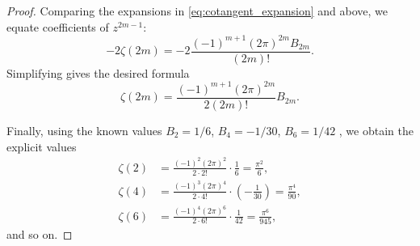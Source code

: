 \begin{corollary}
\begin{proof}
Comparing the expansions in \eqref{eq:cotangent_expansion} and above, we equate coefficients of $z^{2m-1}$:
$$
-2 \zeta(2m) = -2 \frac{(-1)^{m+1} (2\pi)^{2m} B_{2m}}{(2m)!}.
$$
Simplifying gives the desired formula
$$
\zeta(2m) = \frac{(-1)^{m+1} (2\pi)^{2m}}{2 (2m)!} B_{2m}.
$$

Finally, using the known values $B_2 = 1/6$, $B_4 = -1/30$, $B_6 = 1/42$ , we obtain the explicit values
\begin{align*}
\zeta(2) &= \frac{(-1)^{2} (2\pi)^2}{2 \cdot 2!} \cdot \frac{1}{6} = \frac{\pi^2}{6}, \\
\zeta(4) &= \frac{(-1)^{3} (2\pi)^4}{2 \cdot 4!} \cdot \left(-\frac{1}{30}\right) = \frac{\pi^4}{90}, \\
\zeta(6) &= \frac{(-1)^{4} (2\pi)^6}{2 \cdot 6!} \cdot \frac{1}{42} = \frac{\pi^6}{945},
\end{align*}
and so on.
\end{proof}
\end{corollary}